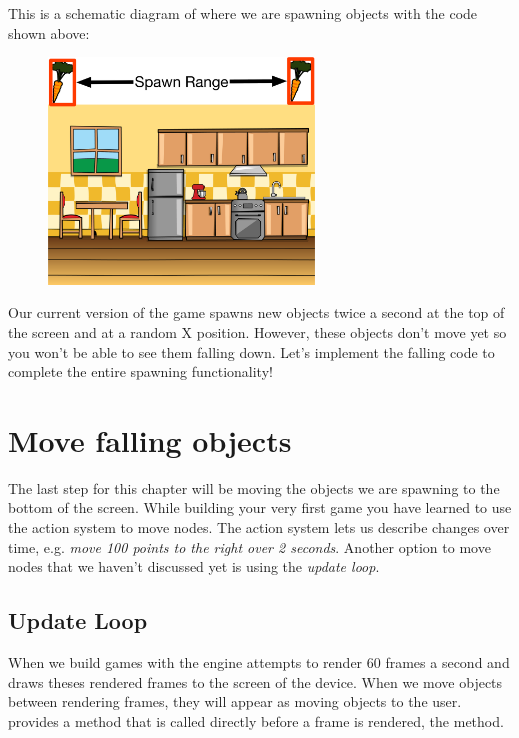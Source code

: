 This is a schematic diagram of where we are spawning
objects with the code shown above:

\begin{figure}[H]
		\centering
		\includegraphics[width=200pt]{images/Chapter2/SpawnObjects.png}
\end{figure}

Our current version of the game spawns new objects twice a second at the top of
the screen and at a random X position. However, these objects don't move yet so
you won't be able to see them falling down. Let's implement the falling code to
complete the entire spawning functionality!

\section{Move falling objects}
The last step for this chapter will be moving the objects we are spawning to the
bottom of the screen. While building your very first \SB{} game you have learned
to use the \cocos{} action system to move nodes. The action system lets us
describe changes over time, e.g. \textit{move 100 points to the right over 2
seconds}. Another option to move nodes that we haven't
discussed yet is using the \cocos{} \textit{update loop}.

\subsection{Update Loop}
When we build games with \cocos{} the engine attempts to render 60 frames a
second and draws theses rendered frames to the screen of the device. When we
move objects between rendering frames, they will appear as moving objects to the
user. \cocos{} provides a method that is called directly before a frame is
rendered, the  method.

